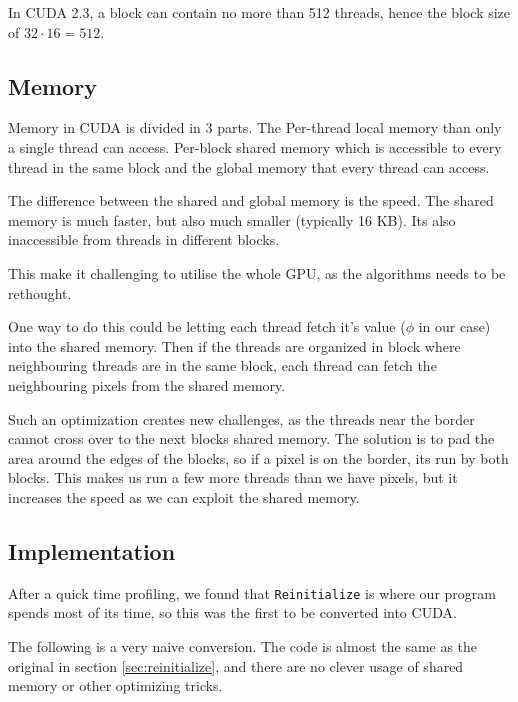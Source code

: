 In CUDA 2.3, a block can contain no more than 512 threads, hence the
block size of $32\cdot 16 = 512$.


\subsection{Memory}

Memory in CUDA is divided in 3 parts. The Per-thread local memory than
only a single thread can access. Per-block shared memory which is
accessible to every thread in the same block and the global
memory that every thread can access. 

The difference between the shared and global memory is the speed. The
shared memory is much faster, but also much smaller (typically 16
KB). Its also inaccessible from threads in different blocks.

This make it challenging to utilise the whole GPU, as the algorithms
needs to be rethought.

One way to do this could be letting each thread fetch it's value
($\phi$ in our case) into the shared memory. Then if the threads are
organized in block where neighbouring threads are in the same block,
each thread can fetch the neighbouring pixels from the shared memory.

Such an optimization creates new challenges, as the threads near the
border cannot cross over to the next blocks shared memory. The
solution is to pad the area around the edges of the blocks, so if a
pixel is on the border, its run by both blocks. This makes us run a
few more threads than we have pixels, but it increases the speed as we
can exploit the shared memory.

\subsection{Implementation}

After a quick time profiling, we found that \texttt{Reinitialize} is
where our program spends most of its time, so this was the first to be
converted into CUDA.

The following is a very naive conversion. The code is almost the same
as the original in section \ref{sec:reinitialize}, and there are no
clever usage of shared memory or other optimizing tricks.

